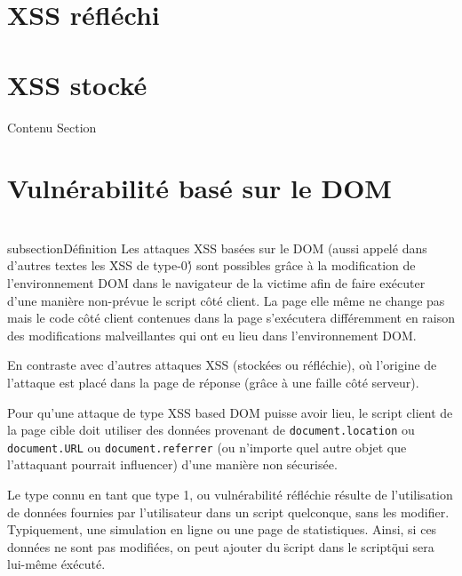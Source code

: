 \documentclass[a4paper,12pt]{report}
\begin{document}
\section{XSS réfléchi}



    \newpage

\section{XSS stocké}
    Contenu Section


\section{Vulnérabilité basé sur le DOM}
  \\subsection{Définition} %
  \label{sub:d_finition}
  Les attaques XSS basées sur le DOM (aussi appelé dans d'autres textes les \'XSS de type-0\') sont possibles grâce à la modification de l'environnement DOM dans le navigateur de la victime afin de faire exécuter d'une manière non-prévue le script côté client. La page elle même ne change pas mais le code côté client contenues dans la page s'exécutera différemment en raison des modifications malveillantes qui ont eu lieu dans l'environnement DOM.

  En contraste avec d'autres attaques XSS (stockées ou réfléchie), où l'origine de l'attaque est placé dans la page de réponse (grâce à une faille côté serveur).

  Pour qu'une attaque de type XSS based DOM puisse avoir lieu, le script client de la page cible doit utiliser des données provenant de \lstinline{document.location} ou \lstinline{document.URL} ou \lstinline{document.referrer} (ou n'importe quel autre objet que l'attaquant pourrait influencer) d'une manière non sécurisée.

  Le type connu en tant que type 1, ou vulnérabilité réfléchie résulte de l'utilisation de données fournies par l'utilisateur dans un script quelconque, sans les modifier. Typiquement, une simulation en ligne ou une page de statistiques. Ainsi, si ces données ne sont pas modifiées, on peut ajouter du \"script dans le script\" qui sera lui-même éxécuté.
\end{document}
